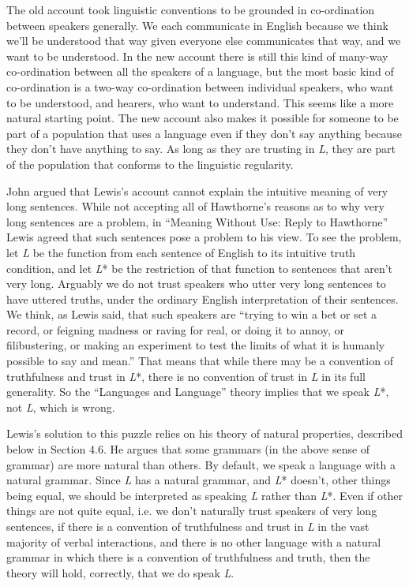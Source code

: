 The old account took linguistic conventions to be grounded in co-ordination between speakers generally. We each communicate in English because we think we'll be understood that way given everyone else communicates that way, and we want to be understood. In the new account there is still this kind of many-way co-ordination between all the speakers of a language, but the most basic kind of co-ordination is a two-way co-ordination between individual speakers, who want to be understood, and hearers, who want to understand. This seems like a more natural starting point. The new account also makes it possible for someone to be part of a population that uses a language even if they don't say anything because they don't have anything to say. As long as they are trusting in \textit{L}, they are part of the population that conforms to the linguistic regularity.

John \citet{Hawthorne1990} argued that Lewis's account cannot explain the intuitive meaning of very long sentences. While not accepting all of Hawthorne's reasons as to why very long sentences are a problem, in ``Meaning Without Use: Reply to Hawthorne'' \citeyearpar{Lewis1992a} Lewis agreed that such sentences pose a problem to his view. To see the problem, let \textit{L} be the function from each sentence of English to its intuitive truth condition, and let \textit{L}* be the restriction of that function to sentences that aren't very long. Arguably we do not trust speakers who utter very long sentences to have uttered truths, under the ordinary English interpretation of their sentences. We think, as Lewis said, that such speakers are ``trying to win a bet or set a record, or feigning madness or raving for real, or doing it to annoy, or filibustering, or making an experiment to test the limits of what it is humanly possible to say and mean.'' \citeyearpar[108]{Lewis1992a} That means that while there may be a convention of truthfulness and trust in \textit{L}*, there is no convention of trust in \textit{L} in its full generality. So the ``Languages and Language'' theory implies that we speak \textit{L}*, not \textit{L}, which is wrong.

Lewis's solution to this puzzle relies on his theory of natural properties, described below in Section 4.6. He argues that some grammars (in the above sense of grammar) are more natural than others. By default, we speak a language with a natural grammar. Since \textit{L} has a natural grammar, and \textit{L}* doesn't, other things being equal, we should be interpreted as speaking \textit{L} rather than \textit{L}*. Even if other things are not quite equal, i.e. we don't naturally trust speakers of very long sentences, if there is a convention of truthfulness and trust in \textit{L} in the vast majority of verbal interactions, and there is no other language with a natural grammar in which there is a convention of truthfulness and truth, then the theory will hold, correctly, that we do speak \textit{L}.

